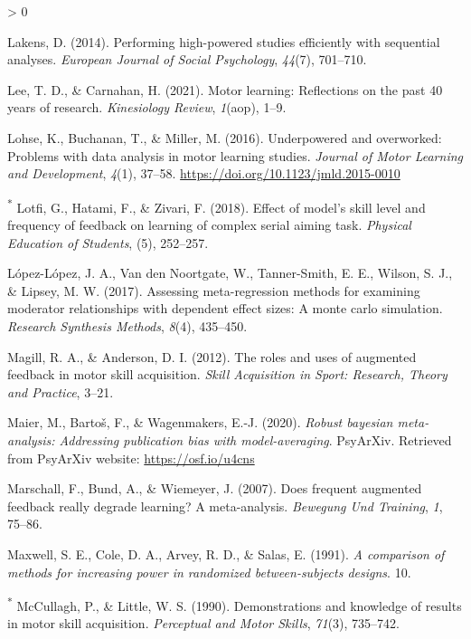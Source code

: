 \documentclass[
  english,
  man, donotrepeattitle,mask,floatsintext]{apa7}
\newlength{\cslhangindent}
\newenvironment{CSLReferences}[2] %
 {%
  \setlength{\parindent}{0pt}
  \ifodd #1 \everypar{\setlength{\hangindent}{\cslhangindent}}\ignorespaces\fi
  \ifnum #2 > 0
  \setlength{\parskip}{#2\baselineskip}
  \fi
 }%
 {}
\begin{document}
\begin{CSLReferences}{1}{0}
\leavevmode\hypertarget{ref-Lakens2014}{}%
Lakens, D. (2014). Performing high-powered studies efficiently with sequential analyses. \emph{European Journal of Social Psychology}, \emph{44}(7), 701--710.

\leavevmode\hypertarget{ref-Lee2021}{}%
Lee, T. D., \& Carnahan, H. (2021). Motor learning: Reflections on the past 40 years of research. \emph{Kinesiology Review}, \emph{1}(aop), 1--9.

\leavevmode\hypertarget{ref-Lohse2016}{}%
Lohse, K., Buchanan, T., \& Miller, M. (2016). Underpowered and overworked: Problems with data analysis in motor learning studies. \emph{Journal of Motor Learning and Development}, \emph{4}(1), 37--58. \url{https://doi.org/10.1123/jmld.2015-0010}

\leavevmode\hypertarget{ref-Lotfi2018}{}%
\textsuperscript{*} Lotfi, G., Hatami, F., \& Zivari, F. (2018). Effect of model's skill level and frequency of feedback on learning of complex serial aiming task. \emph{Physical Education of Students}, (5), 252--257.

\leavevmode\hypertarget{ref-Lopez2017}{}%
López-López, J. A., Van den Noortgate, W., Tanner-Smith, E. E., Wilson, S. J., \& Lipsey, M. W. (2017). Assessing meta-regression methods for examining moderator relationships with dependent effect sizes: A monte carlo simulation. \emph{Research Synthesis Methods}, \emph{8}(4), 435--450.

\leavevmode\hypertarget{ref-Magill2012}{}%
Magill, R. A., \& Anderson, D. I. (2012). The roles and uses of augmented feedback in motor skill acquisition. \emph{Skill Acquisition in Sport: Research, Theory and Practice}, 3--21.

\leavevmode\hypertarget{ref-Maier2020}{}%
Maier, M., Bartoš, F., \& Wagenmakers, E.-J. (2020). \emph{Robust bayesian meta-analysis: Addressing publication bias with model-averaging}. PsyArXiv. Retrieved from PsyArXiv website: \url{https://osf.io/u4cns}

\leavevmode\hypertarget{ref-Marschall2007}{}%
Marschall, F., Bund, A., \& Wiemeyer, J. (2007). Does frequent augmented feedback really degrade learning? A meta-analysis. \emph{Bewegung Und Training}, \emph{1}, 75--86.

\leavevmode\hypertarget{ref-Maxwell1991}{}%
Maxwell, S. E., Cole, D. A., Arvey, R. D., \& Salas, E. (1991). \emph{A comparison of methods for increasing power in randomized between-subjects designs}. 10.

\leavevmode\hypertarget{ref-McCullagh1990}{}%
\textsuperscript{*} McCullagh, P., \& Little, W. S. (1990). Demonstrations and knowledge of results in motor skill acquisition. \emph{Perceptual and Motor Skills}, \emph{71}(3), 735--742.


\end{CSLReferences}
\end{document}
